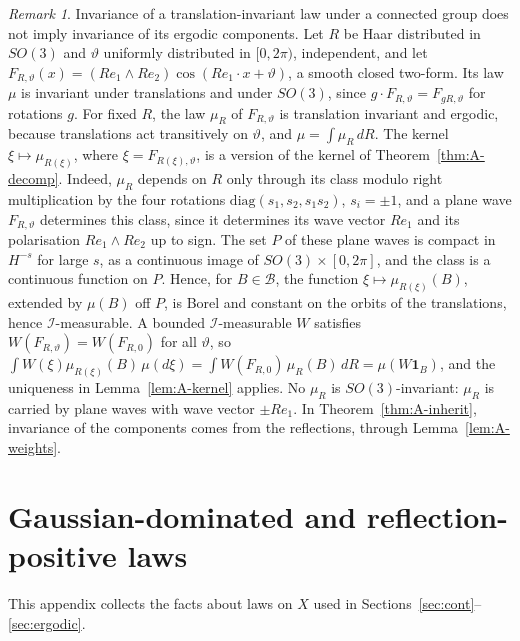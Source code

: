 \documentclass[11pt]{amsart}
\theoremstyle{plain}
\theoremstyle{definition}
\theoremstyle{remark}
\newtheorem{remark}[theorem]{Remark}
\numberwithin{equation}{section}
\newcommand{\cB}{\mathcal{B}}
\newcommand{\cI}{\mathcal{I}}
\begin{document}
\begin{remark}\label{rem:A-connected}
Invariance of a translation-invariant law under a connected group does not imply invariance of its ergodic components. Let $R$ be Haar distributed in $SO(3)$ and $\vartheta$ uniformly distributed in $[0,2\pi)$, independent, and let $F_{R,\vartheta}(x)=(Re_1\wedge Re_2)\cos(Re_1\cdot x+\vartheta)$, a smooth closed two-form. Its law $\mu$ is invariant under translations and under $SO(3)$, since $g\cdot F_{R,\vartheta}=F_{gR,\vartheta}$ for rotations $g$. For fixed $R$, the law $\mu_R$ of $F_{R,\vartheta}$ is translation invariant and ergodic, because translations act transitively on $\vartheta$, and $\mu=\int\mu_R\,dR$. The kernel $\xi\mapsto\mu_{R(\xi)}$, where $\xi=F_{R(\xi),\vartheta}$, is a version of the kernel of Theorem~\ref{thm:A-decomp}. Indeed, $\mu_R$ depends on $R$ only through its class modulo right multiplication by the four rotations $\mathrm{diag}(s_1,s_2,s_1s_2)$, $s_i=\pm1$, and a plane wave $F_{R,\vartheta}$ determines this class, since it determines its wave vector $Re_1$ and its polarisation $Re_1\wedge Re_2$ up to sign. The set $P$ of these plane waves is compact in $H^{-s}$ for large $s$, as a continuous image of $SO(3)\times[0,2\pi]$, and the class is a continuous function on $P$. Hence, for $B\in\cB$, the function $\xi\mapsto\mu_{R(\xi)}(B)$, extended by $\mu(B)$ off $P$, is Borel and constant on the orbits of the translations, hence $\cI$-measurable. A bounded $\cI$-measurable $W$ satisfies $W(F_{R,\vartheta})=W(F_{R,0})$ for all $\vartheta$, so $\int W(\xi)\mu_{R(\xi)}(B)\,\mu(d\xi)=\int W(F_{R,0})\,\mu_R(B)\,dR=\mu(W\mathbf 1_B)$, and the uniqueness in Lemma~\ref{lem:A-kernel} applies. No $\mu_R$ is $SO(3)$-invariant: $\mu_R$ is carried by plane waves with wave vector $\pm Re_1$. In Theorem~\ref{thm:A-inherit}, invariance of the components comes from the reflections, through Lemma~\ref{lem:A-weights}.
\end{remark}

\section{Gaussian-dominated and reflection-positive laws}\label{app:B}

This appendix collects the facts about laws on $X$ used in Sections~\ref{sec:cont}--\ref{sec:ergodic}.
\end{document}
